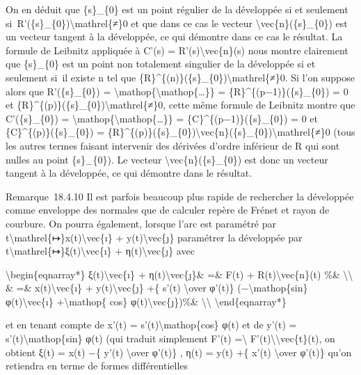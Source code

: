 \documentclass[]{article}
\begin{document}
On en déduit que \{s\}\_\{0\} est un point régulier de la développée si
et seulement si~R'(\{s\}\_\{0\})\textbackslash{}mathrel\{≠\}0 et que
dans ce cas le vecteur \textbackslash{}vec\{n\}(\{s\}\_\{0\}) est un
vecteur tangent à la développée, ce qui démontre dans ce cas le
résultat. La formule de Leibnitz appliquée à C'(s) =
R'(s)\textbackslash{}vec\{n\}(s) nous montre clairement que \{s\}\_\{0\}
est un point non totalement singulier de la développée si et seulement
si~il existe n tel que
\{R\}\^{}\{(n)\}(\{s\}\_\{0\})\textbackslash{}mathrel\{≠\}0. Si l'on
suppose alors que R'(\{s\}\_\{0\}) =
\textbackslash{}mathop\{\textbackslash{}mathop\{\ldots{}\}\} =
\{R\}\^{}\{(p−1)\}(\{s\}\_\{0\}) = 0 et
\{R\}\^{}\{(p)\}(\{s\}\_\{0\})\textbackslash{}mathrel\{≠\}0, cette même
formule de Leibnitz montre que C'(\{s\}\_\{0\}) =
\textbackslash{}mathop\{\textbackslash{}mathop\{\ldots{}\}\} =
\{C\}\^{}\{(p−1)\}(\{s\}\_\{0\}) = 0 et \{C\}\^{}\{(p)\}(\{s\}\_\{0\}) =
\{R\}\^{}\{(p)\}(\{s\}\_\{0\})\textbackslash{}vec\{n\}(\{s\}\_\{0\})\textbackslash{}mathrel\{≠\}0
(tous les autres termes faisant intervenir des dérivées d'ordre
inférieur de R qui sont nulles au point \{s\}\_\{0\}). Le vecteur
\textbackslash{}vec\{n\}(\{s\}\_\{0\}) est donc un vecteur tangent à la
développée, ce qui démontre dans le résultat.

Remarque~18.4.10 Il est parfois beaucoup plus rapide de rechercher la
développée comme enveloppe des normales que de calculer repère de Frénet
et rayon de courbure. On pourra également, lorsque l'arc est paramétré
par t\textbackslash{}mathrel\{↦\}x(t)\textbackslash{}vec\{ı\} +
y(t)\textbackslash{}vec\{ȷ\} paramétrer la développée par
t\textbackslash{}mathrel\{↦\}ξ(t)\textbackslash{}vec\{ı\} +
η(t)\textbackslash{}vec\{ȷ\} avec

\textbackslash{}begin\{eqnarray*\} ξ(t)\textbackslash{}vec\{ı\} +
η(t)\textbackslash{}vec\{ȷ\}\& =\& F(t) +
R(t)\textbackslash{}vec\{n\}(t) \%\& \textbackslash{}\textbackslash{} \&
=\& x(t)\textbackslash{}vec\{ı\} + y(t)\textbackslash{}vec\{ȷ\} +\{
s'(t) \textbackslash{}over φ'(t)\} (−\textbackslash{}mathop\{sin\}
φ(t)\textbackslash{}vec\{ı\} +\textbackslash{}mathop\{ cos\}
φ(t)\textbackslash{}vec\{ȷ\})\%\& \textbackslash{}\textbackslash{}
\textbackslash{}end\{eqnarray*\}

et en tenant compte de x'(t) = s'(t)\textbackslash{}mathop\{cos\} φ(t)
et de y'(t) = s'(t)\textbackslash{}mathop\{sin\} φ(t) (qui traduit
simplement F'(t) =\textbackslash{}\textbar{}
F'(t)\textbackslash{}\textbar{}\textbackslash{}vec\{t\}(t), on obtient
ξ(t) = x(t) −\{ y'(t) \textbackslash{}over φ'(t)\} , η(t) = y(t) +\{
x'(t) \textbackslash{}over φ'(t)\} qu'on retiendra en terme de formes
différentielles
\end{document}
